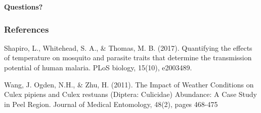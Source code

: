 \documentclass{beamer}
\begin{document}
\begin{frame}
	\Huge \bfseries Questions?
\end{frame}

\begin{frame}
\frametitle{References}
\footnotesize
Shapiro, L., Whitehead, S. A., \& Thomas, M. B. (2017). Quantifying the effects of temperature on mosquito and parasite traits that determine the transmission potential of human malaria. PLoS biology, 15(10), e2003489. 

\vspace{0.5cm}
Wang, J. Ogden, N.H., \& Zhu, H. (2011). The Impact of Weather Conditions on Culex pipiens and Culex restuans (Diptera: Culicidae) Abundance: A Case Study in Peel Region. Journal of Medical Entomology, 48(2), pages 468-475


\end{frame}
\end{document}
